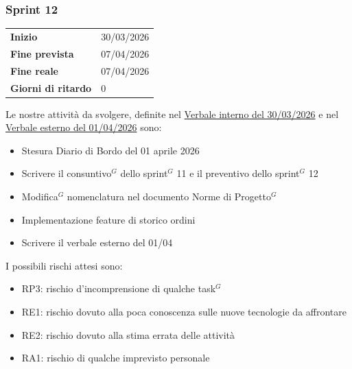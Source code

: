 \subsubsection{Sprint 12}


\begin{tabular}{p{} p{}}
	\textbf{Inizio} & 30/03/2026 \\
	\textbf{Fine prevista} & 07/04/2026 \\
	\textbf{Fine reale} & 07/04/2026 \\
	\textbf{Giorni di ritardo} & 0
\end{tabular}
\newline \newline 
Le nostre attività da svolgere, definite nel \href{https://nullpointersgroup.github.io/Documentazione/output/PB/Verbali%20Interni/2026-03-30_verbale_interno.pdf}{Verbale interno del 30/03/2026} e nel \href{https://nullpointersgroup.github.io/Documentazione/output/PB/Verbali%20Esterni/2026-04-01_verbale_esterno.pdf}{Verbale esterno del 01/04/2026} sono:
\begin{itemize}[itemsep=5pt, parsep=1pt, label=$\scriptstyle\bullet$]
	\item Stesura Diario di Bordo del 01 aprile 2026
	\item Scrivere il consuntivo$^G$ dello sprint$^G$ 11 e il preventivo dello sprint$^G$ 12
    \item Modifica$^G$ nomenclatura nel documento Norme di Progetto$^G$
    \item Implementazione feature di storico ordini
    \item Scrivere il verbale esterno del 01/04
\end{itemize}

I possibili rischi attesi sono:
\begin{itemize}[itemsep=5pt, parsep=1pt, label=$\scriptstyle\bullet$]
	\item RP3: rischio d'incomprensione di qualche task$^G$
	\item RE1: rischio dovuto alla poca conoscenza sulle nuove tecnologie da affrontare
	\item RE2: rischio dovuto alla stima errata delle attività
	\item RA1: rischio di qualche imprevisto personale
\end{itemize}

